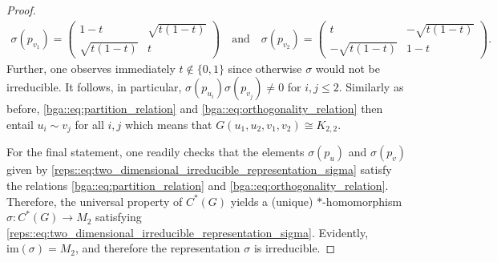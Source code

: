 \documentclass[a4paper]{amsart}
\begin{document}
\begin{proof}
    \begin{align*}
        \sigma(p_{v_1}) = \begin{pmatrix}
            1-t & \sqrt{t(1-t)} \\ \sqrt{t(1-t)} & t
        \end{pmatrix}
        \quad \text{and} \quad 
        \sigma(p_{v_2}) = \begin{pmatrix}
            t & -\sqrt{t(1-t)} \\ -\sqrt{t(1-t)} & 1-t
        \end{pmatrix}.
    \end{align*}
    Further, one observes immediately $t \not \in \{0,1\}$ since otherwise $\sigma$ would not be irreducible. 
    It follows, in particular, $\sigma(p_{u_i}) \sigma(p_{v_j}) \neq 0$ for $i, j \leq 2$. Similarly as before, \eqref{bga::eq:partition_relation} and \eqref{bga::eq:orthogonality_relation} then entail $u_i \sim v_j$ for all $i,j$ which means that $G(u_1, u_2, v_1, v_2) \cong K_{2,2}$.

    For the final statement, one readily checks that the elements $\sigma(p_{u})$ and $\sigma(p_v)$ given by \eqref{reps::eq:two_dimensional_irreducible_representation_sigma} satisfy the relations \eqref{bga::eq:partition_relation} and \eqref{bga::eq:orthogonality_relation}. Therefore, the universal property of $C^\ast(G)$ yields a (unique) $\ast$-homomorphism $\sigma: C^\ast(G) \to M_2$ satisfying \eqref{reps::eq:two_dimensional_irreducible_representation_sigma}. Evidently, $\mathrm{im}(\sigma) = M_2$, and therefore the representation $\sigma$ is irreducible.
\end{proof}
\end{document}

